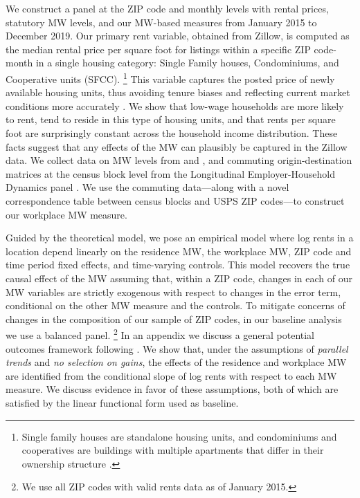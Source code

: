 We construct a panel at the ZIP code and monthly levels with rental prices, 
statutory MW levels, and our MW-based measures from January 2015 to 
December 2019.
Our primary rent variable, obtained from Zillow, is computed as the median 
rental price per square foot for listings within a specific ZIP 
code-month in a single housing category: Single Family houses, Condominiums, 
and Cooperative units (SFCC).%
\footnote{Single family houses are standalone housing units, and condominiums 
	and cooperatives are buildings with multiple apartments that differ in their
	ownership structure \parencite{ZillowTypesOfHomes}.}
This variable captures the posted price of newly available housing units, 
thus avoiding tenure biases and reflecting current market conditions more 
accurately \parencite{AmbroseEtAl2015}.
We show that low-wage households are more likely to rent,
tend to reside in this type of housing units,
and that rents per square foot are surprisingly constant across the household
income distribution.
These facts suggest that any effects of the MW can plausibly be captured 
in the Zillow data.
We collect data on MW levels from \textcite{VaghulZipperer2016} and 
\textcite{BerkeleyLaborCenter}, and commuting origin-destination matrices at 
the census block level from the Longitudinal Employer-Household Dynamics panel 
\parencite{CensusLODES}.
We use the commuting data---along with a novel correspondence table between 
census blocks and USPS ZIP codes---to construct our workplace MW measure.


Guided by the theoretical model, we pose an empirical model where log rents in 
a location depend linearly on
the residence MW,
the workplace MW,
ZIP code and time period fixed effects, and 
time-varying controls.
This model recovers the true causal effect of the MW assuming that, 
within a ZIP code, changes in each of our MW variables are 
strictly exogenous with respect to changes in the error term, 
conditional on the other MW measure and the controls.
To mitigate concerns of changes in the composition of our sample of ZIP codes, 
in our baseline analysis we use a balanced panel.%
\footnote{We use all ZIP codes with valid rents data as of January 2015.}
In an appendix we discuss a general potential outcomes framework following
\textcite{CallawayEtAl2021}.
We show that, under the assumptions of \textit{parallel trends} and 
\textit{no selection on gains}, 
the effects of the residence and workplace MW are identified from the 
conditional slope of log rents with respect to each MW measure.
We discuss evidence in favor of these assumptions, both of which are satisfied 
by the linear functional form used as baseline.

